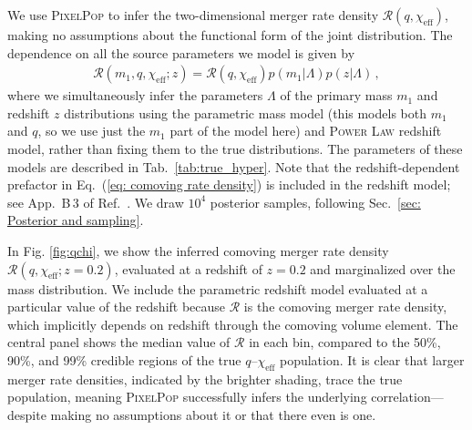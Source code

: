 \documentclass[%
reprint,
 amsmath,amssymb,
 aps,
 prd,nofootinbib,nobibnotes,
 superscriptaddress,groupedaddress,
]{revtex4-2}
\begin{document}
We use \textsc{PixelPop} to infer the two-dimensional merger rate density $\mathcal{R}(q,\chi_\mathrm{eff})$, making no assumptions about the functional form of the joint distribution. The dependence on all the source parameters we model is given by
\begin{align}
\mathcal{R} ( m_1 , q , \chi_\mathrm{eff} ; z )
=
\mathcal{R} ( q, \chi_\mathrm{eff} )
p ( m_1 | \Lambda ) p( z | \Lambda)
\, ,
\label{eq: model q chieff}
\end{align}
where we simultaneously infer the parameters $\Lambda$ of the primary mass $m_1$ and redshift $z$ distributions using the parametric  mass model (this models both $m_1$ and $q$, so we use just the $m_1$ part of the model here) and \textsc{Power Law} redshift model, rather than fixing them to the true distributions. The parameters of these models are described in Tab.~\ref{tab:true_hyper}. Note that the redshift-dependent prefactor in Eq.~(\ref{eq: comoving rate density}) is included in the redshift model; see App.~{B\,3} of Ref.~\cite{KAGRA:2021duu}. We draw $10^4$ posterior samples, following Sec.~\ref{sec: Posterior and sampling}.

In Fig. \ref{fig:qchi}, we show the inferred comoving merger rate density $\mathcal{R}(q,\chi_\mathrm{eff};z=0.2)$, evaluated at a redshift of $z=0.2$ and marginalized over the mass distribution. We include the parametric redshift model evaluated at a particular value of the redshift because $\mathcal{R}$ is the comoving merger rate density, which implicitly depends on redshift through the comoving volume element. The central panel shows the median value of $\mathcal{R}$ in each bin, compared to the 50\%, 90\%, and 99\% credible regions of the true $q$--$\chi_\mathrm{eff}$ population. It is clear that larger merger rate densities, indicated by the brighter shading, trace the true population, meaning \textsc{PixelPop} successfully infers the underlying correlation---despite making no assumptions about it or that there even is one.
\end{document}
